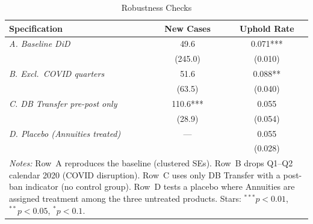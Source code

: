 \begin{table}[t]
\centering
\caption{Robustness Checks}
\label{tab:robust}
\begin{tabular}{lcc}
\hline\hline
Specification & New Cases & Uphold Rate \\
\hline
\textit{A. Baseline DiD} & 49.6 & 0.071*** \\
& (245.0) & (0.010) \\
\textit{B. Excl.\ COVID quarters} & 51.6 & 0.088** \\
& (63.5) & (0.040) \\
\textit{C. DB Transfer pre-post only} & 110.6*** & 0.055 \\
& (28.9) & (0.054) \\
\textit{D. Placebo (Annuities treated)} & --- & 0.055 \\
& & (0.028) \\
\hline\hline
\multicolumn{3}{p{0.8\textwidth}}{\footnotesize \textit{Notes:} Row~A reproduces the baseline (clustered SEs). Row~B drops Q1--Q2 calendar 2020 (COVID disruption). Row~C uses only DB Transfer with a post-ban indicator (no control group). Row~D tests a placebo where Annuities are assigned treatment among the three untreated products. Stars: $^{***}p<0.01$, $^{**}p<0.05$, $^{*}p<0.1$.}
\end{tabular}
\end{table}

